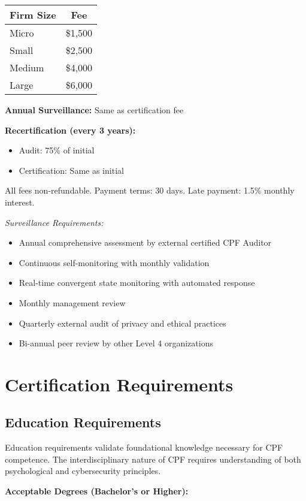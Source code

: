 \documentclass[11pt,a4paper]{article}
\begin{document}
\begin{tabular}{|l|c|}
\hline
\textbf{Firm Size} & \textbf{Fee} \\
\hline
Micro & \$1,500 \\
Small & \$2,500 \\
Medium & \$4,000 \\
Large & \$6,000 \\
\hline
\end{tabular}

\textbf{Annual Surveillance:} Same as certification fee

\textbf{Recertification (every 3 years):}
\begin{itemize}
\item Audit: 75\% of initial
\item Certification: Same as initial
\end{itemize}

All fees non-refundable. Payment terms: 30 days. Late payment: 1.5\% monthly interest.

\textit{Surveillance Requirements:}
\begin{itemize}
\item Annual comprehensive assessment by external certified CPF Auditor
\item Continuous self-monitoring with monthly validation
\item Real-time convergent state monitoring with automated response
\item Monthly management review
\item Quarterly external audit of privacy and ethical practices
\item Bi-annual peer review by other Level 4 organizations
\end{itemize}

\section{Certification Requirements}

\subsection{Education Requirements}

Education requirements validate foundational knowledge necessary for CPF competence. The interdisciplinary nature of CPF requires understanding of both psychological and cybersecurity principles.

\textbf{Acceptable Degrees (Bachelor's or Higher):}
\end{document}
